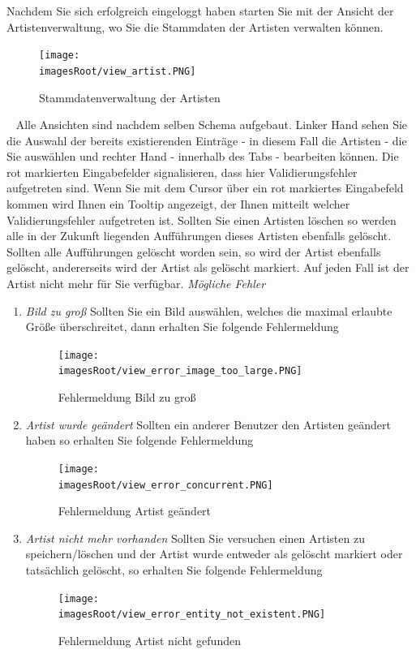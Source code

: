 \documentclass[11pt, a4paper, twoside]{article}   	%
\newcommand{\imagesRoot}{images}
\begin{document}
\newline
Nachdem Sie sich erfolgreich eingeloggt haben starten Sie mit der Ansicht der Artistenverwaltung, wo Sie die Stammdaten der Artisten verwalten können.
\begin{figure}[h]
	\centering
	\texttt{[image: \\imagesRoot/view\_artist.PNG]}
	\caption
	{Stammdatenverwaltung der Artisten}
\end{figure}
\ \newline 
Alle Ansichten sind nachdem selben Schema aufgebaut. Linker Hand sehen Sie die Auswahl der bereits existierenden Einträge - in diesem Fall die Artisten - die Sie auswählen und rechter Hand - innerhalb des Tabs - bearbeiten können. Die rot markierten Eingabefelder signalisieren, dass hier Validierungsfehler aufgetreten sind. Wenn Sie mit dem Cursor über ein rot markiertes Eingabefeld kommen wird Ihnen ein Tooltip angezeigt, der Ihnen mitteilt welcher Validierungsfehler aufgetreten ist.
\newline
\newline
Sollten Sie einen Artisten löschen so werden alle in der Zukunft liegenden Aufführungen dieses Artisten ebenfalls gelöscht. Sollten alle Aufführungen gelöscht worden sein, so wird der Artist ebenfalls gelöscht, andererseits wird der Artist als gelöscht markiert. Auf jeden Fall ist der Artist nicht mehr für Sie verfügbar.
\newline
\newpage
\emph{Mögliche Fehler}
\begin{enumerate}
	\item\emph{Bild zu groß}
	\newline
	Sollten Sie ein Bild auswählen, welches die maximal erlaubte Größe überschreitet, dann erhalten Sie folgende Fehlermeldung
	\begin{figure}[h]
	\centering
	\texttt{[image: \\imagesRoot/view\_error\_image\_too\_large.PNG]}
	\caption
	{Fehlermeldung Bild zu groß}
\end{figure}
\item\emph{Artist wurde geändert}
\newline
Sollten ein anderer Benutzer den Artisten geändert haben so erhalten Sie folgende Fehlermeldung
	\begin{figure}[h]
	\centering
	\texttt{[image: \\imagesRoot/view\_error\_concurrent.PNG]}
	\caption
	{Fehlermeldung Artist geändert}
\end{figure}
\item\emph{Artist nicht mehr vorhanden}
\newline
Sollten Sie versuchen einen Artisten zu speichern/löschen und der Artist wurde entweder als gelöscht markiert oder tatsächlich gelöscht, so erhalten Sie folgende Fehlermeldung
	\begin{figure}[h]
	\centering
	\texttt{[image: \\imagesRoot/view\_error\_entity\_not\_existent.PNG]}
	\caption
	{Fehlermeldung Artist nicht gefunden}
\end{figure}	
\end{enumerate}
\end{document}
